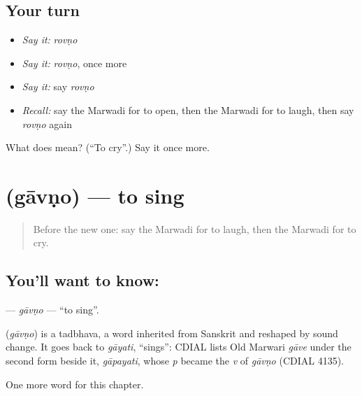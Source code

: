 \subsection*{Your turn}
\begin{itemize}
\raggedright
  \item \emph{Say it:} \emph{rovṇo}
  \item \emph{Say it:} \emph{rovṇo}, once more
  \item \emph{Say it:} say \emph{rovṇo}
  \item \emph{Recall:} say the Marwadi for to open, then the Marwadi for to laugh, then say \emph{rovṇo} again
\end{itemize}

\begin{tcolorbox}[breakable,colback=teal!4,colframe=teal!35!black,title={Before you move on}]
What does  mean? (\textquotedblleft{}To cry\textquotedblright{}.) Say it once more.
\end{tcolorbox}
\section[\texorpdfstring{\mw{गावणो} (gāvṇo)}{गावणो (gāvṇo)}]{ (gāvṇo) — to sing}

\label{lesson:MW-C54-gavno}



\begin{quote}
Before the new one: say the Marwadi for to laugh, then the Marwadi for to cry.
\end{quote}

\subsection*{You'll want to know: }
\textbf{} — \emph{gāvṇo} — \textquotedblleft{}to sing\textquotedblright{}.

\begin{cousinweb}
\textbf{} (\emph{gāvṇo}) is a tadbhava, a word inherited from Sanskrit and reshaped by sound change. It goes back to \emph{gāyati}, \textquotedblleft{}sings\textquotedblright{}: CDIAL lists Old Marwari \emph{gāve} under the second form beside it, \emph{gāpayati}, whose \emph{p} became the \emph{v} of \emph{gāvṇo} (CDIAL 4135).
\end{cousinweb}

\begin{grammarlens}[title={What you've built}]
One more word for this chapter.
\end{grammarlens}

